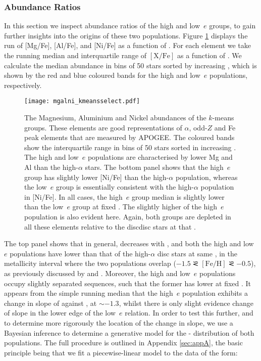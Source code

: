 \subsubsection{Abundance Ratios}
\label{sec:abundances}
 In this section we inspect abundance ratios of the high and
low~$e$ groups, to gain further insights into the origins of these
two populations.  Figure \ref{fig:mgalni} displays the run of
[Mg/Fe], [Al/Fe], and [Ni/Fe] as a function of \feh{}.  For each
element we take the running median and interquartile range of
$\mathrm{[X/Fe]}$ as a function of \feh{}. We calculate
the median abundance in bins of 50 stars sorted by increasing \feh{},
which is shown by the red and blue coloured bands for the high and
low~$e$ populations, respectively.

\begin{figure}
\texttt{[image: mgalni\_kmeansselect.pdf]}
\caption{\label{fig:mgalni} The Magnesium, Aluminium and Nickel
abundances of the $k$-means groups. These elements are good representations of $\alpha$, odd-$Z$ and
Fe peak elements that are measured by APOGEE. The coloured bands
show the interquartile range in bins of 50 stars
sorted in increasing \feh{}. The high and low~$e$ populations
are characterised by lower Mg and Al than the high-$\alpha$ stars.
The bottom panel shows that the high~$e$ group has slightly lower
[Ni/Fe] than the high-$\alpha$ population, whereas the low~$e$ group
is essentially consistent with the high-$\alpha$ population in
[Ni/Fe]. In all cases, the high~$e$ group median
is slightly lower than the low~$e$ group at fixed \feh{}. The
slightly higher \feh{} of the high~$e$ population is also evident
here.  Again, both groups are depleted in all these elements relative
to the discdisc stars at that \feh{}.}
\end{figure}

The top panel shows that in general, \mgfe{} decreases with \feh{},
and both the high and low~$e$ populations have \mgfe{} lower than
that of the high-$\alpha$ disc stars at same \feh{}, in the metallicity
interval where the two populations overlap
($\mathrm{-1.5\simless[Fe/H]\simless-0.5}$), as previously discussed
by \cite{2018ApJ...852...49H} and \citet{2018ApJ...852...50F}.
Moreover, the high and low~$e$ populations occupy slightly separated
sequences, such that the former has lower \mgfe{} at fixed \feh{}.
It appears from the simple running median that the high~$e$ population
exhibits a change in slope of \mgfe{} against \feh{}, at \feh{}$\sim-1.3$,
whilst there is only slight evidence change of slope in the lower
edge of the low~$e$ relation.  In order to test this further, and
to determine more rigorously the location of the change in slope,
we use a Bayesian inference to determine a generative model for the
\mgfe{}-\feh{} distribution of both populations. The full procedure
is outlined in Appendix \ref{sec:appA}, the basic principle being
that we fit a piecewise-linear model to the data of the form:

